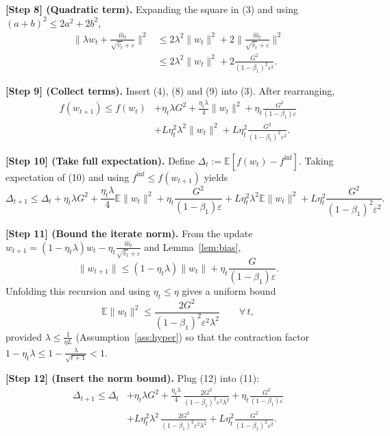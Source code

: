 \documentclass{article}
\newcommand{\E}{\mathbb{E}}
\begin{document}
\noindent\textbf{[Step 8] (Quadratic term).}
Expanding the square in (3) and using $(a+b)^{2}\le2a^{2}+2b^{2}$,
\[
\begin{aligned}
\Big\|\lambda w_{t}+ \frac{\hat m_{t}}{\sqrt{\hat v_{t}}+\varepsilon}\Big\|^{2}
   &\le 2\lambda^{2}\|w_{t}\|^{2}
        +2\Big\|\frac{\hat m_{t}}{\sqrt{\hat v_{t}}+\varepsilon}\Big\|^{2}\\
   &\le 2\lambda^{2}\|w_{t}\|^{2}
        +2\frac{G^{2}}{(1-\beta_{1})^{2}\varepsilon^{2}} .
\end{aligned}
\tag{9}
\]

\noindent\textbf{[Step 9] (Collect terms).}
Insert (4), (8) and (9) into (3). After rearranging,
\[
\begin{aligned}
f(w_{t+1})\le f(w_{t})
 &+ \eta_{t}\lambda G^{2}
   +\frac{\eta_{t}\lambda}{4}\|w_{t}\|^{2}
   +\eta_{t}\frac{G^{2}}{(1-\beta_{1})\varepsilon}\\
 &+ L\eta_{t}^{2}\lambda^{2}\|w_{t}\|^{2}
   +L\eta_{t}^{2}\frac{G^{2}}{(1-\beta_{1})^{2}\varepsilon^{2}} .
\end{aligned}
\tag{10}
\]

\noindent\textbf{[Step 10] (Take full expectation).}
Define $\Delta_{t}:=\E[f(w_{t})-f^{\inf}]$. Taking expectation of (10) and using $f^{\inf}\le f(w_{t+1})$ yields
\[
\Delta_{t+1}\le \Delta_{t}
   +\eta_{t}\lambda G^{2}
   +\frac{\eta_{t}\lambda}{4}\E\|w_{t}\|^{2}
   +\eta_{t}\frac{G^{2}}{(1-\beta_{1})\varepsilon}
   +L\eta_{t}^{2}\lambda^{2}\E\|w_{t}\|^{2}
   +L\eta_{t}^{2}\frac{G^{2}}{(1-\beta_{1})^{2}\varepsilon^{2}} .
\tag{11}
\]

\noindent\textbf{[Step 11] (Bound the iterate norm).}
From the update $w_{t+1}= (1-\eta_{t}\lambda)w_{t} -\eta_{t}\frac{\hat m_{t}}{\sqrt{\hat v_{t}}+\varepsilon}$ and Lemma~\ref{lem:bias},
\[
\|w_{t+1}\|\le (1-\eta_{t}\lambda)\|w_{t}\|
          +\eta_{t}\frac{G}{(1-\beta_{1})\varepsilon}.
\]
Unfolding this recursion and using $\eta_{t}\le\eta$ gives a uniform bound
\[
\E\|w_{t}\|^{2}\le \frac{2G^{2}}{(1-\beta_{1})^{2}\varepsilon^{2}\lambda^{2}}
      \qquad\forall\,t,
\tag{12}
\]
provided $\lambda\le\frac{1}{\eta L}$ (Assumption~\ref{ass:hyper}) so that the contraction factor $1-\eta_{t}\lambda\le1-\frac{\lambda}{\sqrt{t+1}}<1$.

\noindent\textbf{[Step 12] (Insert the norm bound).}
Plug (12) into (11):
\[
\begin{aligned}
\Delta_{t+1}\le \Delta_{t}
 &+ \eta_{t}\lambda G^{2}
 +\frac{\eta_{t}\lambda}{4}\,\frac{2G^{2}}{(1-\beta_{1})^{2}\varepsilon^{2}\lambda^{2}}
 +\eta_{t}\frac{G^{2}}{(1-\beta_{1})\varepsilon}\\
 &+L\eta_{t}^{2}\lambda^{2}\,\frac{2G^{2}}{(1-\beta_{1})^{2}\varepsilon^{2}\lambda^{2}}
 +L\eta_{t}^{2}\frac{G^{2}}{(1-\beta_{1})^{2}\varepsilon^{2}} .
\end{aligned}
\tag{13}
\]
\end{document}
